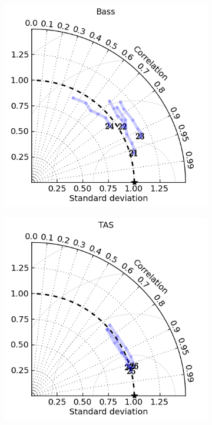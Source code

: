 \begin{figure}[!hbt]
\begin{subfigure}{0.30\textwidth}
        \includegraphics[width=\textwidth]{figures/plots/taylor_diag_res_Bass.png}
        \caption{}
    \end{subfigure}
    \begin{subfigure}{0.30\textwidth}
          \includegraphics[width=\textwidth]{figures/plots/taylor_diag_res_TAS.png}

\end{subfigure}
\end{figure}
